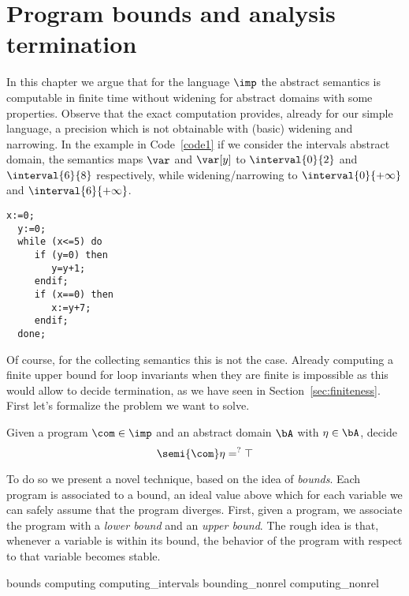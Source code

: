 \chapter{Program bounds and analysis termination}\label{chap:axiomatized}


In this chapter we argue that for the language \(\imp\) the abstract
semantics is computable in finite time without widening for abstract
domains with some properties.  Observe that the exact computation
provides, already for our simple language, a precision which is not
obtainable with (basic) widening and narrowing. In the example in
Code~\ref{code1} if we consider the intervals abstract domain, the
semantics maps \(\var\) and \(\var[y]\) to \(\interval{0}{2}\) and
\(\interval{6}{8}\) respectively, while widening/narrowing to
\(\interval{0}{+\infty}\) and \(\interval{6}{+\infty}\).

\begin{lstlisting}[caption=Code sample where analysis of
  \(\fix{\com}\) is less precise than \(\com^*\), label=code1,
  language=Imp]
  x:=0;
  y:=0;
  while (x<=5) do
     if (y=0) then
        y=y+1;
     endif;
     if (x==0) then
        x:=y+7;
     endif;
  done;
\end{lstlisting}

Of course, for the collecting semantics this is not the case. Already
computing a finite upper bound for loop invariants when they are
finite is impossible as this would allow to decide termination, as we
have seen in Section~\ref{sec:finiteness}. First let's formalize the
problem we want to solve.

\begin{problem}\label{problem1}
  Given a program \(\com\in \imp\) and an abstract domain \(\bA\) with
  \(\eta \in \bA\), decide
  \begin{equation*}
    \semi{\com} \eta =^? \top
  \end{equation*}
\end{problem}

To do so we present a novel technique, based on the idea of
\emph{bounds}. Each program is associated to a bound, an ideal value
above which for each variable we can safely assume that the program
diverges.  First, given a program, we associate the program with a
\emph{lower bound} and an \emph{upper bound}. The rough idea is that,
whenever a variable is within its bound, the behavior of the program
with respect to that variable becomes stable. %

{bounds}
{computing}
{computing_intervals}
{bounding_nonrel}
{computing_nonrel}
